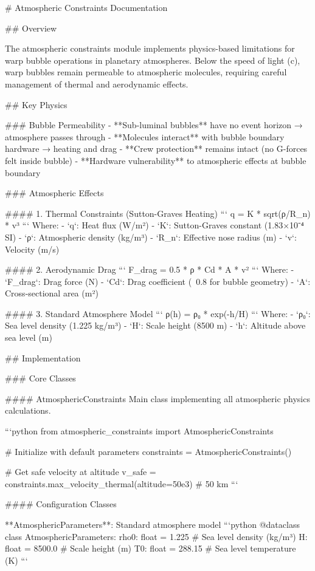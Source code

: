 # Atmospheric Constraints Documentation

## Overview

The atmospheric constraints module implements physics-based limitations for warp bubble operations in planetary atmospheres. Below the speed of light (c), warp bubbles remain permeable to atmospheric molecules, requiring careful management of thermal and aerodynamic effects.

## Key Physics

### Bubble Permeability
- **Sub-luminal bubbles** have no event horizon → atmosphere passes through
- **Molecules interact** with bubble boundary hardware → heating and drag
- **Crew protection** remains intact (no G-forces felt inside bubble)
- **Hardware vulnerability** to atmospheric effects at bubble boundary

### Atmospheric Effects

#### 1. Thermal Constraints (Sutton-Graves Heating)
```
q = K * sqrt(ρ/R_n) * v³
```
Where:
- `q`: Heat flux (W/m²)
- `K`: Sutton-Graves constant (1.83×10⁻⁴ SI)
- `ρ`: Atmospheric density (kg/m³)
- `R_n`: Effective nose radius (m)
- `v`: Velocity (m/s)

#### 2. Aerodynamic Drag
```
F_drag = 0.5 * ρ * Cd * A * v²
```
Where:
- `F_drag`: Drag force (N)
- `Cd`: Drag coefficient (~0.8 for bubble geometry)
- `A`: Cross-sectional area (m²)

#### 3. Standard Atmosphere Model
```
ρ(h) = ρ₀ * exp(-h/H)
```
Where:
- `ρ₀`: Sea level density (1.225 kg/m³)
- `H`: Scale height (8500 m)
- `h`: Altitude above sea level (m)

## Implementation

### Core Classes

#### AtmosphericConstraints
Main class implementing all atmospheric physics calculations.

```python
from atmospheric_constraints import AtmosphericConstraints

# Initialize with default parameters
constraints = AtmosphericConstraints()

# Get safe velocity at altitude
v_safe = constraints.max_velocity_thermal(altitude=50e3)  # 50 km
```

#### Configuration Classes

**AtmosphericParameters**: Standard atmosphere model
```python
@dataclass
class AtmosphericParameters:
    rho0: float = 1.225        # Sea level density (kg/m³)
    H: float = 8500.0          # Scale height (m)
    T0: float = 288.15         # Sea level temperature (K)
```

